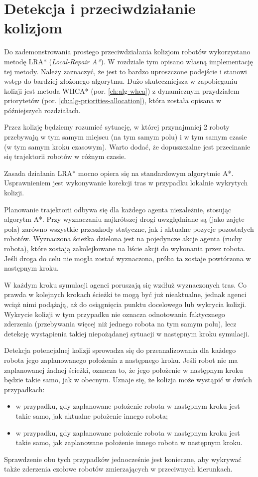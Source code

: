 \section{Detekcja i przeciwdziałanie kolizjom}
\label{ch:alg-collision-avoid}
Do zademonstrowania prostego przeciwdziałania kolizjom robotów wykorzystano metodę LRA* ({\it Local-Repair A*}).
W rozdziale tym opisano własną implementację tej metody.
Należy zaznaczyć, że jest to bardzo uproszczone podejście i stanowi wstęp do bardziej złożonego algorytmu.
Dużo skuteczniejsza w zapobieganiu kolizji jest metoda WHCA* (por. \ref{ch:alg-whca}) z dynamicznym przydziałem priorytetów (por. \ref{ch:alg-priorities-allocation}), która została opisana w późniejszych rozdziałach.

Przez kolizję będziemy rozumieć sytuację, w której przynajmniej 2 roboty przebywają w tym samym miejscu (na tym samym polu) i w tym samym czasie (w tym samym kroku czasowym). Warto dodać, że dopuszczalne jest przecinanie się trajektorii robotów w różnym czasie.

Zasada działania LRA* mocno opiera się na standardowym algorytmie A*. Usprawnieniem jest wykonywanie korekcji tras w przypadku lokalnie wykrytych kolizji.

Planowanie trajektorii odbywa się dla każdego agenta niezależnie, stosując algorytm A*. Przy wyznaczaniu najkrótszej drogi uwzględniane są (jako zajęte pola) zarówno wszystkie przeszkody statyczne, jak i aktualne pozycje pozostałych robotów. Wyznaczona ścieżka dzielona jest na pojedyncze akcje agenta (ruchy robota), które zostają zakolejkowane na liście akcji do wykonania przez robota. Jeśli droga do celu nie mogła zostać wyznaczona, próba ta zostaje powtórzona w następnym kroku.

W każdym kroku symulacji agenci poruszają się wzdłuż wyznaczonych tras. Co prawda w kolejnych krokach ścieżki te mogą być już nieaktualne, jednak agenci wciąż nimi podążają, aż do osiągnięcia punktu docelowego lub wykrycia kolizji.
Wykrycie kolizji w tym przypadku nie oznacza odnotowania faktycznego zderzenia (przebywania więcej niż jednego robota na tym samym polu), lecz detekcję wystąpienia takiej niepożądanej sytuacji w następnym kroku symulacji.

Detekcja potencjalnej kolizji sprowadza się do przeanalizowania dla każdego robota jego zaplanowanego położenia z następnego kroku. Jeśli robot nie ma zaplanowanej żadnej ścieżki, oznacza to, że jego położenie w następnym kroku będzie takie samo, jak w obecnym. Uznaje się, że kolizja może wystąpić w dwóch przypadkach:
\begin{itemize}
	\item w przypadku, gdy zaplanowane położenie robota w następnym kroku jest takie samo, jak aktualne położenie innego robota;
	\item w przypadku, gdy zaplanowane położenie robota w następnym kroku jest takie samo, jak zaplanowane położenie innego robota w następnym kroku.
\end{itemize}
Sprawdzenie obu tych przypadków jednocześnie jest konieczne, aby wykrywać także zderzenia czołowe robotów zmierzających w przeciwnych kierunkach.

